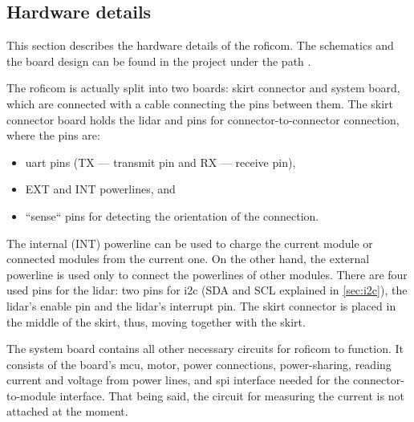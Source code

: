 \documentclass[
  digital,     %
  oneside,     %
  nosansbold,  %
  nocolorbold, %
  nolof,         %
  nolot,         %
]{fithesis4}
\newcommand{\TODO}[1]{#1} %
\newcommand{\TODOLIST}[1]{}
\begin{document}
\subsection{ Hardware details } \label{sec:roficom-hw}
\TODOLIST{
\begin{itemize}
    \item \acrshort{mcu}
    \item motor
    \item \acrshort{uart}
    \item \acrshort{spi}
    \item \acrshort{i2c}
    \item EXT and INT power lines
\end{itemize}
}

This section describes the hardware details of the \acrshort{roficom}. The schematics and the board
design can be found in the project under the path
.

The \acrshort{roficom} is actually split into two boards: skirt connector and system board, which
are connected with a cable connecting the pins between them. The skirt connector board holds the
\acrshort{lidar} and pins for connector-to-connector connection, where the pins are: 

\begin{itemize}
    \item \acrshort{uart} pins (TX --- transmit pin and RX --- receive pin),
    \item EXT and INT powerlines, and
    \item ``sense`` pins for detecting the orientation of the connection.
\end{itemize}

The internal (INT) powerline can be used to charge the current module or connected modules from the
current one. On the other hand, the external powerline is used only to connect the powerlines of
other modules. There are four used pins for the \acrshort{lidar}: two pins for \acrshort{i2c} (SDA
and SCL explained in \autoref{sec:i2c}), the \acrshort{lidar}'s enable pin and the
\acrshort{lidar}'s interrupt pin. The skirt connector is placed in the middle of the skirt, thus,
moving together with the skirt.

The system board contains all other necessary circuits for \acrshort{roficom} to function. It
consists of the board's \acrfull{mcu}, motor, power connections, power-sharing, reading current and
voltage from power lines, and \acrshort{spi} interface needed for the connector-to-module interface.
That being said, the circuit for measuring the current is not attached at the moment.
\end{document}
